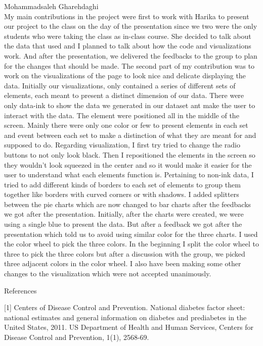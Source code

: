 \documentclass[12pt]{article}
\numberwithin{figure}{section}
\begin{document}
{\sf Mohammadsaleh Gharehdaghi}\\
My main contributions in the project were first to work with Harika to present our project to the class on the day of the presentation since we two were the only students who were taking the class as in-class course. She decided to talk about the data that used and I planned to talk about how the code and visualizations work. And after the presentation, we delivered the feedbacks to the group to plan for the changes that should be made.
The second part of my contribution was to work on the visualizations of the page to look nice and delicate displaying the data. Initially our visualizations, only contained a series of different sets of elements, each meant to present a distinct dimension of our data. There were only data-ink to show the data we generated in our dataset ant make the user to interact with the data. The element were positioned all in the middle of the screen. Mainly there were only one color or few to present elements in each set and event between each set to make a distinction of what they are meant for and supposed to do.
Regarding visualization, I first try tried to change the radio buttons to not only look black. Then I repositioned the elements in the screen so they wouldn’t look squeezed in the center and so it would make it easier for the user to understand what each elements function is. Pertaining to non-ink data, I tried to add different kinds of borders to each set of elements to group them together like borders with curved corners or with shadows. I added splitters between the pie charts which are now changed to bar charts after the feedbacks we got after the presentation.
Initially, after the charts were created, we were using a single blue to present the data. But after a feedback we got after the presentation which told us to avoid using similar color for the three charts. I used the color wheel to pick the three colors. In the beginning I split the color wheel to three to pick the three colors but after a discussion with the group, we picked three adjacent colors in the color wheel. I also have been making some other changes to the visualization which were not accepted unanimously.

\newpage

{\sf References}

[1] Centers of Disease Control and Prevention. National diabetes factor sheet: national estimates and general information on diabetes and prediabetes in the United States, 2011. US Department of Health and Human Services, Centers for Disease Control and Prevention, 1(1), 2568-69.
\end{document}

